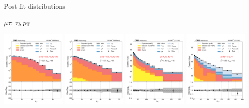 \begin{frame}{Post-fit distributions}

    \begin{tcolorbox}{$\mu\tau$: $\tau_{h}\,p_{\mathrm{T}}$}
        \begin{center}
            \includegraphics[width=0.24\textwidth]{chapters/Analysis/sectionStatisticalAnalysis/figures/fit/mutau_cat_eq0_eq0}
            \includegraphics[width=0.24\textwidth]{chapters/Analysis/sectionStatisticalAnalysis/figures/fit/mutau_cat_eq1_eq0}
            \includegraphics[width=0.24\textwidth]{chapters/Analysis/sectionStatisticalAnalysis/figures/fit/mutau_cat_gt2_eq0}
            \includegraphics[width=0.24\textwidth]{chapters/Analysis/sectionStatisticalAnalysis/figures/fit/mutau_cat_eq1_eq1}


\end{center}
\end{tcolorbox}
\end{frame}
